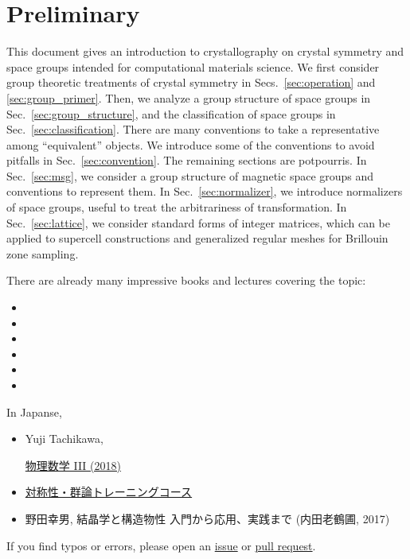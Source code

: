 \section{\label{sec:preliminary}Preliminary}

This document gives an introduction to crystallography on crystal symmetry and space groups intended for computational materials science.
We first consider group theoretic treatments of crystal symmetry in Secs.~\ref{sec:operation} and \ref{sec:group_primer}.
Then, we analyze a group structure of space groups in Sec.~\ref{sec:group_structure}, and the classification of space groups in Sec.~\ref{sec:classification}.
There are many conventions to take a representative among ``equivalent'' objects.
We introduce some of the conventions to avoid pitfalls in Sec.~\ref{sec:convention}.
The remaining sections are potpourris.
In Sec.~\ref{sec:msg}, we consider a group structure of magnetic space groups and conventions to represent them.
In Sec.~\ref{sec:normalizer}, we introduce normalizers of space groups, useful to treat the arbitrariness of transformation.
In Sec.~\ref{sec:lattice}, we consider standard forms of integer matrices, which can be applied to supercell constructions and generalized regular meshes for Brillouin zone sampling.

There are already many impressive books and lectures covering the topic:
\begin{itemize}
    \item {}
    \item {}
    \item {}
    \item {}
    \item {}
    \item {}
\end{itemize}

In Japanse,
\begin{itemize}
    \item Yuji Tachikawa, \begin{CJK}{UTF8}{ipxm}\href{https://member.ipmu.jp/yuji.tachikawa/lectures/2018-butsurisuugaku3/}{物理数学 III (2018)}\end{CJK}
    \item \begin{CJK}{UTF8}{ipxm}\href{http://pfwww.kek.jp/trainingcourse/bunken.html}{対称性・群論トレーニングコース}\end{CJK}
    \item \begin{CJK}{UTF8}{ipxm}野田幸男, 結晶学と構造物性 入門から応用、実践まで (内田老鶴圃, 2017)\end{CJK}
\end{itemize}

If you find typos or errors, please open an \href{https://github.com/lan496/crystal-symmetry-primer/issues?q=is%3Aissue+is%3Aopen+sort%3Aupdated-desc}{issue} or \href{https://github.com/lan496/crystal-symmetry-primer/pulls?q=is%3Apr+is%3Aopen+sort%3Aupdated-desc}{pull request}.

